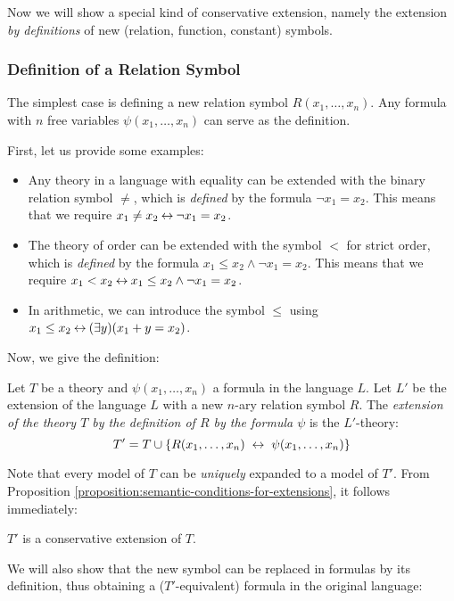Now we will show a special kind of conservative extension, namely the extension \emph{by definitions} of new (relation, function, constant) symbols.

\subsubsection*{Definition of a Relation Symbol}

The simplest case is defining a new relation symbol $R(x_1,\dots,x_n)$. Any formula with $n$ free variables $\psi(x_1,\dots,x_n)$ can serve as the definition.

\begin{example}
First, let us provide some examples:
\begin{itemize}
    \item Any theory in a language with equality can be extended with the binary relation symbol $\neq$, which is \emph{defined} by the formula $\neg x_1=x_2$. This means that we require $x_1\neq x_2\mathbin{\leftrightarrow}\neg x_1=x_2$.
    \item The theory of order can be extended with the symbol $<$ for strict order, which is \emph{defined} by the formula $x_1\leq x_2\land \neg x_1=x_2$. This means that we require $x_1<x_2 \mathbin{\leftrightarrow} x_1\leq x_2\land \neg x_1=x_2$.
    \item In arithmetic, we can introduce the symbol $\leq$ using $x_1\leq x_2\mathbin{\leftrightarrow}(\exists y)(x_1+y=x_2)$.
\end{itemize}
\end{example}
Now, we give the definition:
\begin{definition}
    Let $T$ be a theory and $\psi(x_1,\dots,x_n)$ a formula in the language $L$. Let $L'$ be the extension of the language $L$ with a new $n$-ary relation symbol $R$. The \emph{extension of the theory $T$ by the definition of $R$ by the formula $\psi$} is the $L'$-theory:
    $$
    T'=T\cup\{R(x_1,\dots,x_n)\ \liff\ \psi(x_1,\dots,x_n)\}
    $$
\end{definition}
Note that every model of $T$ can be \emph{uniquely} expanded to a model of $T'$. From Proposition \ref{proposition:semantic-conditions-for-extensions}, it follows immediately:
\begin{corollary}
    $T'$ is a conservative extension of $T$.
\end{corollary}

We will also show that the new symbol can be replaced in formulas by its definition, thus obtaining a ($T'$-equivalent) formula in the original language:

